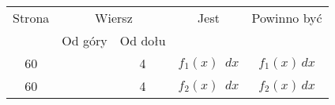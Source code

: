 \documentclass[a4paper,11pt]{article}
\numberwithin{equation}{section}
\begin{document}























\newpage


\VerSpaceFive


\begin{center}

  \begin{tabular}{|c|c|c|c|c|}
    \hline
    Strona & \multicolumn{2}{c|}{Wiersz} & Jest
    & Powinno być \\ \cline{2-3}
    & Od góry & Od dołu & & \\
    \hline
    60 & & \hphantom{0}4 & $f_{ 1 }( x ) \;\: dx$ & $f_{ 1 }( x ) \, dx$ \\
    60 & & \hphantom{0}4 & $f_{ 2 }( x ) \;\: dx$ & $f_{ 2 }( x ) \, dx$ \\
    \hline
  \end{tabular}

\end{center}

\VerSpaceTwo


\end{document}
